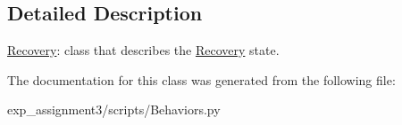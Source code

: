 \subsection{Detailed Description}
\hyperlink{classBehaviors_1_1Recovery}{Recovery}\+: class that describes the \hyperlink{classBehaviors_1_1Recovery}{Recovery} state. 

The documentation for this class was generated from the following file\+:\begin{DoxyCompactItemize}
\item 
exp\+\_\+assignment3/scripts/Behaviors.\+py\end{DoxyCompactItemize}
